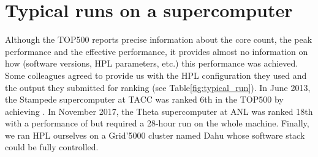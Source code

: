     \section{Typical runs on a supercomputer}%
    \label{sec:hpl:typical_runs}

        Although the TOP500 reports precise information about the core count,
        the peak performance and the effective performance, it provides almost
        no information on how (software versions, HPL parameters, etc.) this
        performance was achieved. Some colleagues agreed to provide us with
        the HPL configuration they used and the output they submitted for
        ranking (see Table\ref{fig:typical_run}).
        In June 2013, the Stampede supercomputer at TACC was ranked
        6th in the TOP500 by achieving . In November
        2017, the Theta supercomputer at ANL was ranked 18th with a performance of 
        but required a 28-hour run on the
        whole machine. Finally, we ran HPL ourselves on a Grid'5000 cluster
        named Dahu whose software stack could be fully controlled.

